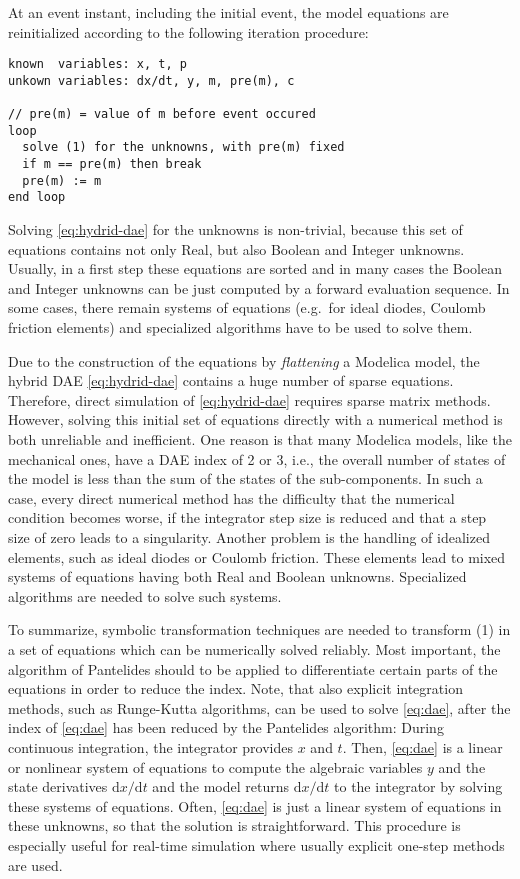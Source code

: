 At an event instant, including the initial event, the model equations
are reinitialized according to the following iteration procedure:
\begin{lstlisting}[language=modelica]
known  variables: x, t, p
unkown variables: dx/dt, y, m, pre(m), c

// pre(m) = value of m before event occured
loop
  solve (1) for the unknowns, with pre(m) fixed
  if m == pre(m) then break
  pre(m) := m
end loop
\end{lstlisting}
Solving \eqref{eq:hydrid-dae} for the unknowns is non-trivial, because this set of
equations contains not only Real, but also Boolean and Integer unknowns.
Usually, in a first step these equations are sorted and in many cases
the Boolean and Integer unknowns can be just computed by a forward
evaluation sequence. In some cases, there remain systems of equations
(e.g.\ for ideal diodes, Coulomb friction elements) and specialized
algorithms have to be used to solve them.

Due to the construction of the equations by \emph{flattening} a Modelica
model, the hybrid DAE \eqref{eq:hydrid-dae} contains a huge number of sparse equations.
Therefore, direct simulation of \eqref{eq:hydrid-dae} requires sparse matrix methods.
However, solving this initial set of equations directly with a numerical
method is both unreliable and inefficient. One reason is that many
Modelica models, like the mechanical ones, have a DAE index of 2 or 3,
i.e., the overall number of states of the model is less than the sum of
the states of the sub-components. In such a case, every direct numerical
method has the difficulty that the numerical condition becomes worse, if
the integrator step size is reduced and that a step size of zero leads
to a singularity. Another problem is the handling of idealized elements,
such as ideal diodes or Coulomb friction. These elements lead to mixed
systems of equations having both Real and Boolean unknowns. Specialized
algorithms are needed to solve such systems.

To summarize, symbolic transformation techniques are needed to transform
(1) in a set of equations which can be numerically solved reliably. Most
important, the algorithm of Pantelides should to be applied to
differentiate certain parts of the equations in order to reduce the
index. Note, that also explicit integration methods, such as Runge-Kutta
algorithms, can be used to solve \eqref{eq:dae}, after the index of \eqref{eq:dae} has been
reduced by the Pantelides algorithm: During continuous integration, the
integrator provides $x$ and $t$. Then, \eqref{eq:dae} is a linear or nonlinear system
of equations to compute the algebraic variables $y$ and the state
derivatives $\mathrm{d}x/\mathrm{d}t$ and the model returns $\mathrm{d}x/\mathrm{d}t$ to the integrator by
solving these systems of equations. Often, \eqref{eq:dae} is just a linear system
of equations in these unknowns, so that the solution is straightforward.
This procedure is especially useful for real-time simulation where
usually explicit one-step methods are used.
